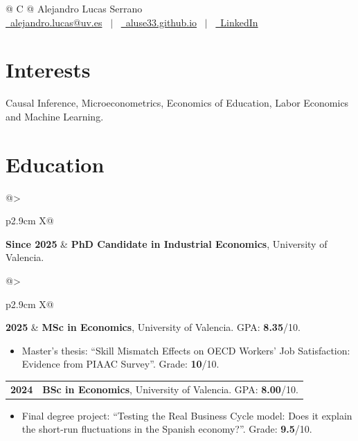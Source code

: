 \documentclass[a4paper,11pt]{article}
\makeatletter
\newcommand{\faEnvelope}{}\newcommand{\faGlobe}{}%
\newcommand{\entry}[2]{%
  \begin{tabularx}{\linewidth}{@{}>{\raggedright\arraybackslash}p{2.9cm} X@{}}
    \textbf{#1} & #2
  \end{tabularx}\par}
\makeatother
\begin{document}
\pagestyle{empty}

\begin{tabularx}{\linewidth}{@{} C @{}}
\Huge{Alejandro Lucas Serrano} \\[7pt]
\href{mailto:alejandro.lucas@uv.es}{\raisebox{-0.05\height}\faEnvelope\ alejandro.lucas@uv.es} \ $|$ \
\href{https://aluse33.github.io}{\raisebox{-0.05\height}\faGlobe\ aluse33.github.io} \ $|$ \
\href{https://www.linkedin.com/in/alejandro-lucas-797530392/}{\raisebox{-0.05\height}\faLinkedin\ LinkedIn}
\end{tabularx}

\section{Interests}

{\raggedright Causal Inference, Microeconometrics, Economics of Education, Labor Economics and Machine Learning.\par}

\section{Education}

\entry{Since 2025}{\textbf{PhD Candidate in Industrial Economics}, University of Valencia.}

\entry{2025}{\textbf{MSc in Economics}, University of Valencia. GPA: \textbf{8.35}/10.}
\begin{itemize}
  \item Master's thesis: ``Skill Mismatch Effects on OECD Workers' Job Satisfaction:
        Evidence from PIAAC Survey''. Grade: \textbf{10}/10.
\end{itemize}

\entry{2024}{\textbf{BSc in Economics}, University of Valencia. GPA: \textbf{8.00}/10.}
\begin{itemize}
  \item Final degree project: ``Testing the Real Business Cycle model: Does it explain the
        short-run fluctuations in the Spanish economy?''. Grade: \textbf{9.5}/10.
\end{itemize}
\end{document}
